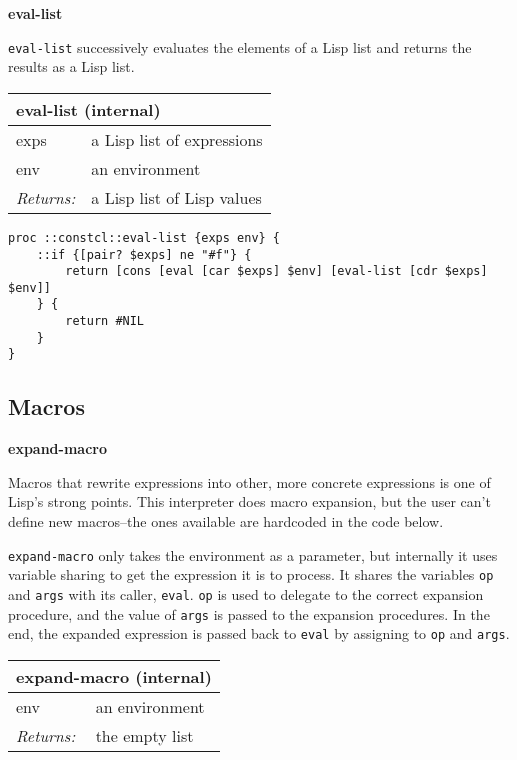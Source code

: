\documentclass{report}
\begin{document}
\textbf{eval-list}


\texttt{eval-list} successively evaluates the elements of a Lisp list and returns the results as a Lisp list.

\begin{tabular}{ |l l| }
\hline
\multicolumn{2}{|l|}{eval-list (internal)} \\
\hline
exps & a Lisp list of expressions \\
env & an environment \\
\textit{Returns:} & a Lisp list of Lisp values \\
\hline
\end{tabular}

\noindent\makebox[\linewidth]{\rule{\linewidth}{0.4pt}}
\begin{lstlisting}
proc ::constcl::eval-list {exps env} {
    ::if {[pair? $exps] ne "#f"} {
        return [cons [eval [car $exps] $env] [eval-list [cdr $exps] $env]]
    } {
        return #NIL
    }
}
\end{lstlisting}
\noindent\makebox[\linewidth]{\rule{\linewidth}{0.4pt}}
\subsection{Macros}
\label{macros}

\textbf{expand-macro}


Macros that rewrite expressions into other, more concrete expressions is one of Lisp's strong points. This interpreter does macro expansion, but the user can't define new macros--the ones available are hardcoded in the code below.


\texttt{expand-macro} only takes the environment as a parameter, but internally it uses variable sharing to get the expression it is to process. It shares the variables \texttt{op} and \texttt{args} with its caller, \texttt{eval}. \texttt{op} is used to delegate to the correct expansion procedure, and the value of \texttt{args} is passed to the expansion procedures. In the end, the expanded expression is passed back to \texttt{eval} by assigning to \texttt{op} and \texttt{args}.

\begin{tabular}{ |l l| }
\hline
\multicolumn{2}{|l|}{expand-macro (internal)} \\
\hline
env & an environment \\
\textit{Returns:} & the empty list \\
\hline
\end{tabular}
\end{document}
